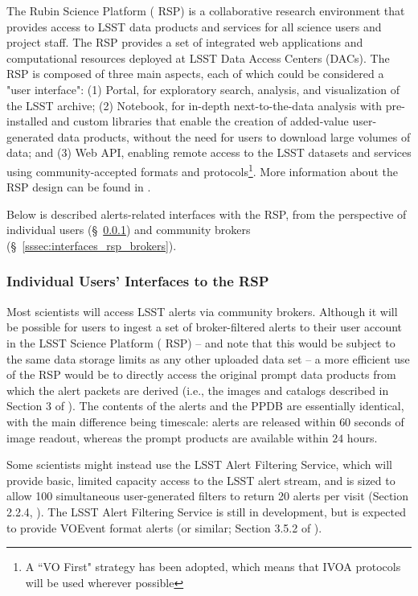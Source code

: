 The Rubin  {Science Platform} ( {RSP}) is a collaborative research environment that provides access to   LSST data products and services for all science users and project staff.
The  {RSP} provides a set of integrated web applications and computational resources deployed at   LSST Data Access Centers (DACs).
The  {RSP} is composed of three main aspects, each of which could be considered a "user interface":
(1) Portal, for exploratory search, analysis, and visualization of the   LSST archive;
(2) Notebook, for in-depth next-to-the-data analysis with pre-installed and custom libraries that enable the creation of added-value user-generated data products, without the need for users to download large volumes of data; and
(3) Web  {API}, enabling remote access to the   LSST datasets and services using community-accepted formats and protocols\footnote{A ``VO First" strategy has been adopted, which means that IVOA protocols will be used wherever possible}.
More information about the  {RSP} design can be found in \citealt{LSE-319, LDM-542}.

Below is described alerts-related interfaces with the  {RSP}, from the perspective of individual users (\S~\ref{sssec:interfaces_rsp_individual}) and community brokers (\S~\ref{sssec:interfaces_rsp_brokers}).

\subsubsection{Individual Users' Interfaces to the  {RSP}}\label{sssec:interfaces_rsp_individual}

Most scientists will access   LSST alerts via community brokers.
Although it will be possible for users to ingest a set of broker-filtered alerts to their user account in the   LSST  {Science Platform} ( {RSP}) -- and note that this would be subject to the same data storage limits as any other uploaded data set -- a more efficient use of the  {RSP} would be to directly access the original prompt data products from which the alert packets are derived (i.e., the images and catalogs described in Section 3 of \citealt{LSE-163}).
The contents of the alerts and the  {PPDB} are essentially identical, with the main difference being timescale: alerts are released within $60$ seconds of image readout, whereas the prompt products are available within $24$ hours.

Some scientists might instead use the   LSST  {Alert} Filtering Service, which will provide basic, limited capacity access to the   LSST alert stream, and is sized to allow 100 simultaneous user-generated filters to return 20 alerts per visit (Section 2.2.4, \citealt{LSE-61}).
The   LSST  {Alert} Filtering Service is still in development, but is expected to provide VOEvent format alerts (or similar; Section 3.5.2 of \citealt{LSE-163}).

